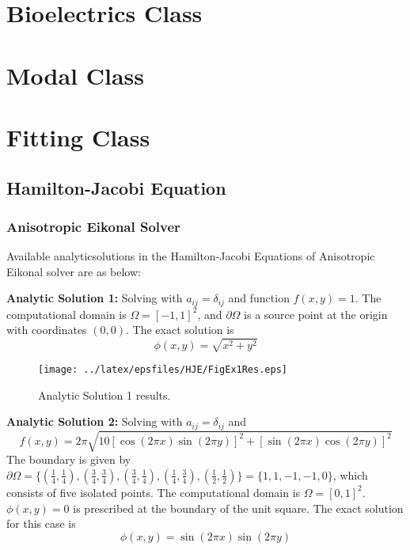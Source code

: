 \section{Bioelectrics Class}
\clearpage
%
\clearpage
%
%

\section{Modal Class}
\clearpage

\section{Fitting Class}
\clearpage
%

\subsection{Hamilton-Jacobi Equation}

\subsubsection{Anisotropic Eikonal Solver}

Available analyticsolutions in the Hamilton-Jacobi Equations of Anisotropic Eikonal solver are as below:


\textbf{Analytic Solution 1:} Solving with $a_{ij}=\delta_{ij}$ and function $f(x,y)=1$. The computational domain is $\Omega=[-1,1]^2$, and $\partial\Omega$ is a source point at the origin with coordinates $(0,0)$. The exact solution is $$\phi(x,y)=\sqrt{x^2+y^2}$$

\begin{figure}[h]
  \centering
    \texttt{[image: ../latex/epsfiles/HJE/FigEx1Res.eps]}
  \caption{Analytic Solution 1 results.}
  \label{fig:Ex1}
\end{figure}


\textbf{Analytic Solution 2:} Solving with $a_{ij}=\delta_{ij}$ and $$f(x,y)=2\pi \sqrt{10[\cos{(2\pi x)}\sin{(2\pi y)}]^2+[\sin{(2\pi x)}\cos{(2\pi y)}]^2}$$ The boundary is given by $\partial\Omega=\{(\frac{1}{4},\frac{1}{4}),(\frac{3}{4},\frac{3}{4}),(\frac{3}{4},\frac{1}{4}),(\frac{1}{4},\frac{3}{4}),(\frac{1}{2},\frac{1}{2})\}=\{1,1,-1,-1,0\}$, which consists of five isolated points. The computational domain is $\Omega=[0,1]^2$. $\phi(x,y)=0$ is prescribed at the boundary of the unit square. The exact solution for this case is $$\phi(x,y)=\sin{(2\pi x)} \sin{(2\pi y)}$$

